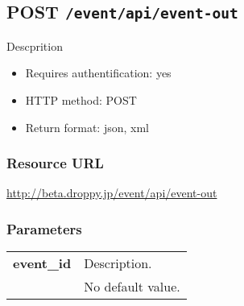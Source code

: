 \documentclass[11pt,a4paper]{article}
\newcommand{\content}[1]{\begin{minipage}{10cm}\vspace{2mm}#1\vspace{2mm}\end{minipage}}
\begin{document}
      \newpage
      
      
  \subsection*{POST {\tt /event/api/event-out}}
  Descprition
  \begin{itemize}
  \item Requires authentification: yes
  \item HTTP method: POST
  \item Return format: json, xml
  \end{itemize}
  \subsubsection*{Resource URL}
  \url{http://beta.droppy.jp/event/api/event-out}
  \subsubsection*{Parameters}
  \begin{table}[h]
    \begin{center}
      \begin{tabular}{l l}
        \hline 
      \textbf{event\_id} & \content{Description. }
      \\
       & No default value.\\
      \hline
      \end{tabular}
    \end{center}
  \end{table}
  
      \newpage
      
\end{document}
